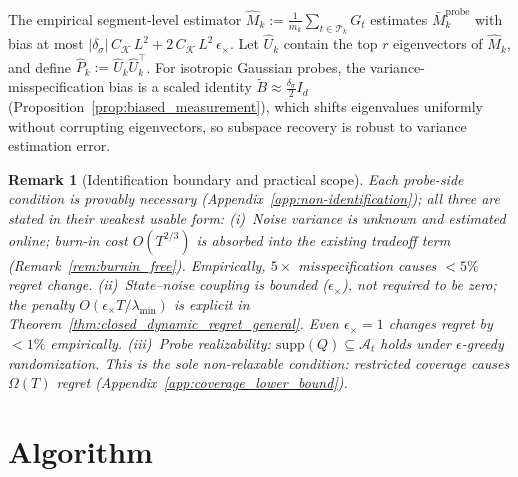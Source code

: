 \documentclass{article}
\newcommand{\cA}{\mathcal{A}}
\newcommand{\cT}{\mathcal{T}}
\newcommand{\supp}{\mathrm{supp}}
\newtheorem{remark}{Remark}
\begin{document}
The empirical segment-level estimator $\widehat M_k := \frac{1}{m_k}\sum_{t\in\cT_k} G_t$ estimates $\bar M_k^{\mathrm{probe}}$ with bias at most $|\delta_\sigma|\,C_{\mathcal K}\,L^2 + 2\,C_{\mathcal K}\,L^2\,\epsilon_\times$. Let $\widehat U_k$ contain the top $r$ eigenvectors of $\widehat M_k$, and define $\widehat P_k := \widehat U_k \widehat U_k^\top$.
For isotropic Gaussian probes, the variance-misspecification bias is a scaled identity $\widetilde B \approx \frac{\delta_\sigma}{2}I_d$ (Proposition~\ref{prop:biased_measurement}), which shifts eigenvalues uniformly without corrupting eigenvectors, so subspace recovery is robust to variance estimation error.

\begin{remark}[Identification boundary and practical scope]
  \label{rem:necessity_compact}
  Each probe-side condition is provably necessary (Appendix~\ref{app:non-identification}); all three are stated in their weakest usable form:
  \emph{(i)~Noise variance} is unknown and estimated online; burn-in cost $O(T^{2/3})$ is absorbed into the existing tradeoff term
  (Remark~\ref{rem:burnin_free}). Empirically, $5\times$ misspecification causes $<5\%$ regret change.
  \emph{(ii)~State--noise coupling} is bounded ($\epsilon_\times$), not required to be zero; the penalty $O(\epsilon_\times T/\lambda_{\min})$ is explicit in Theorem~\ref{thm:closed_dynamic_regret_general}. Even $\epsilon_\times{=}1$ changes regret by $<1\%$ empirically.
  \emph{(iii)~Probe realizability:} $\supp(Q) \subseteq \cA_t$ holds under $\epsilon$-greedy randomization. This is the sole non-relaxable condition: restricted coverage causes $\Omega(T)$ regret (Appendix~\ref{app:coverage_lower_bound}).
  \end{remark}













\section{Algorithm}
\label{sec:algorithm}
\end{document}
